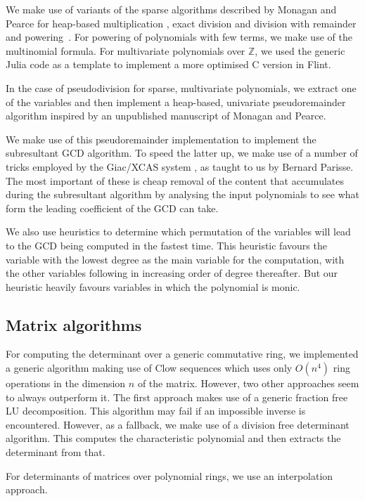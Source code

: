 \documentclass{sig-alternate-05-2015}
\begin{document}
We make use of variants of the sparse algorithms described by Monagan and
Pearce for heap-based multiplication \cite{heapmul}, exact division and division with
remainder \cite{heapdiv} and powering~\cite{heappow}. For powering of polynomials with
few terms, we make use of the multinomial formula.
For multivariate polynomials over $\mathbb{Z}$, we used the generic Julia
code as a template to implement a more optimised C version in Flint.

In the case of pseudodivision for sparse, multivariate polynomials, we extract one
of the variables and then implement a heap-based, univariate pseudoremainder
algorithm inspired by an unpublished manuscript of Monagan and Pearce.

We make use of this pseudoremainder implementation to implement the subresultant
GCD algorithm. To speed the latter up, we make use of a number of tricks employed by the
Giac/XCAS system \cite{giac}, as taught to us by Bernard Parisse. The most important
of these is cheap removal of the content that accumulates during the subresultant
algorithm by analysing the input polynomials to see what form the leading coefficient
of the GCD can take.

We also use heuristics to determine which permutation of the variables will lead to
the GCD being computed in the fastest time. This heuristic favours the variable with
the lowest degree as the main variable for the computation, with the other variables 
following in increasing order of degree thereafter. But our heuristic heavily favours
variables in which the polynomial is monic.

\subsection{Matrix algorithms}

For computing the determinant over a generic commutative ring, we implemented a generic
algorithm making use of Clow sequences \cite{clow} which uses only $O(n^4)$ ring operations
in the dimension $n$ of the matrix. However, two other approaches seem to always outperform
it. The first approach makes use of a generic fraction free LU decomposition. This algorithm
may fail if an impossible inverse is encountered. However, as a fallback, we make use of a
division free determinant algorithm. This computes the characteristic polynomial and then
extracts the determinant from that.

For determinants of matrices over polynomial rings, we use an interpolation approach.
\end{document}

